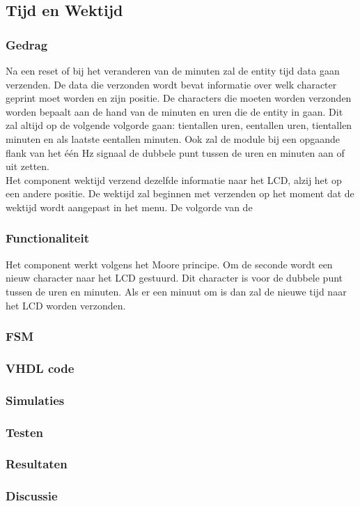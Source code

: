 \subsection{Tijd en Wektijd}

\subsubsection{Gedrag}
Na een reset of bij het veranderen van de minuten zal de entity tijd data gaan verzenden. De data die verzonden wordt bevat informatie over welk character geprint moet worden en zijn positie. De characters die moeten worden verzonden worden bepaalt aan de hand van de minuten en uren die de entity in gaan. Dit zal altijd op de volgende volgorde gaan: tientallen uren, eentallen uren, tientallen minuten en als laatste eentallen minuten. Ook zal de module bij een opgaande flank van het \'e\'en Hz signaal de dubbele punt tussen de uren en minuten aan of uit zetten.\\
Het component wektijd verzend dezelfde informatie naar het LCD, alzij het op een andere positie. De wektijd zal beginnen met verzenden op het moment dat de wektijd wordt aangepast in het menu. De volgorde van de

\subsubsection{Functionaliteit}
Het component werkt volgens het Moore principe. Om de seconde wordt een nieuw character naar het LCD gestuurd. Dit character is voor de dubbele punt tussen de uren en minuten. Als er een minuut om is dan zal de nieuwe tijd naar het LCD worden verzonden.

\subsubsection{FSM}

\subsubsection{VHDL code}

\subsubsection{Simulaties}

\subsubsection{Testen}

\subsubsection{Resultaten}

\subsubsection{Discussie}
